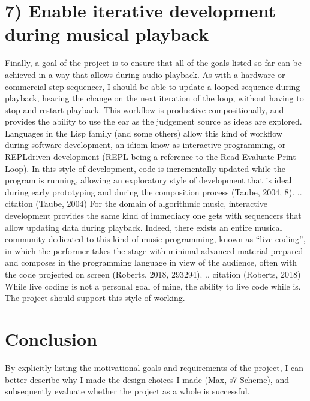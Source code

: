 \documentclass[letterpaper,10pt,english]{sphinxmanual}
\begin{document}
\section{7) Enable iterative development during musical playback}
\label{\detokenize{goals:enable-iterative-development-during-musical-playback}}
\sphinxAtStartPar
Finally, a goal of the project is to ensure that all of the goals listed so far can be achieved in a way that
allows  during audio playback.
As with a hardware or commercial step sequencer, I should be able to update a looped sequence during playback,
hearing the change on the next iteration of the loop, without having to stop and restart playback.
This workflow is productive compositionally, and provides the ability to use the ear as the judgement source as ideas are explored.
Languages in the Lisp family (and some others) allow this kind of workflow during software development,
an idiom know as interactive programming, or REPL\sphinxhyphen{}driven development (REPL being a reference to the Read Evaluate Print Loop).
In this style of development, code is incrementally updated while the program is running, allowing an exploratory style of development
that is ideal during early prototyping and during the composition process (Taube, 2004, 8).
.. citation (Taube, 2004)
For the domain of algorithmic music, interactive development provides the same kind of immediacy one
gets with sequencers that allow updating data during playback.
Indeed, there exists an entire musical community dedicated to this kind of music programming,
known as “live coding”, in which the performer takes the stage with minimal advanced material prepared
and composes in the programming language in view of the audience, often with the code projected on screen
(Roberts, 2018, 293\sphinxhyphen{}294).
.. citation (Roberts, 2018)
While  live coding is not a personal goal of mine, the ability to live code while  is.
The project should support this style of working.


\section{Conclusion}
\label{\detokenize{goals:conclusion}}
\sphinxAtStartPar
By explicitly listing the motivational goals and requirements of the project, I can
better describe why I made the design choices I made (Max, s7 Scheme),
and subsequently evaluate whether the project as a whole is successful.
\end{document}
